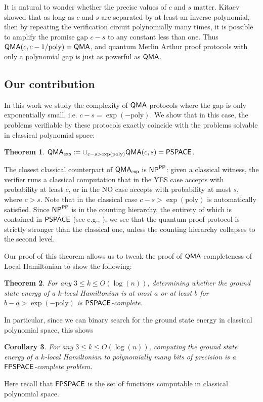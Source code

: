 \documentclass[11pt]{article}
\newtheorem{theorem}{Theorem}
\newtheorem{corollary}[theorem]{Corollary}
\theoremstyle{definition}
\theoremstyle{remark}
\newcommand\QMA{{\sf{QMA}}}
\newcommand\PSPACE{{\sf{PSPACE}}}
\newcommand\FPSPACE{{\sf{FPSPACE}}}
\newcommand\PP{\sf{PP}}
\newcommand\NP{{\sf{NP}}}
\newcommand\QMAexp{{\sf{QMA}_{exp}}}
\newcommand{\poly}{\textrm{poly}}
\begin{document}
It is natural to wonder whether the precise values of $c$ and $s$ matter. Kitaev showed \cite{ksv02} that as long as $c$ and $s$ are separated by at least an inverse polynomial, then by repeating the verification circuit polynomially many times, it is possible to amplify the promise gap $c-s$ to any constant less than one. Thus $\QMA(c,c-1/\poly) = \QMA$, and quantum Merlin Arthur proof protocols with only a polynomial gap is just as powerful as $\QMA$.

\subsection{Our contribution}

In this work we study the complexity of $\QMA$ protocols where the gap is only exponentially small, i.e. $c-s = \exp(-\poly)$. We show that in this case, the problems verifiable by these protocols exactly coincide with the problems solvable in classical polynomial space:

\begin{theorem}
$\QMAexp := \cup_{c-s > \exp(\poly)}\QMA(c,s) = \PSPACE$.
\end{theorem}

The closest classical counterpart of $\QMAexp$ is $\NP^{\PP}$: given a classical witness, the verifier runs a classical computation that in the YES case accepts with probability at least $c$, or in the NO case accepts with probability at most $s$, where $c>s$. Note that in the classical case $c - s > \exp(\poly)$ is automatically satisfied. Since $\NP^{\PP}$ is in the counting hierarchy, the entirety of which is contained in $\PSPACE$ (see e.g., \cite{allenderwagner}), we see that the quantum proof protocol is strictly stronger than the classical one, unless the counting hierarchy collapses to the second level.

Our proof of this theorem allows us to tweak the proof of $\QMA$-completeness of Local Hamiltonian \cite{ksv02,kr03} to show the following:

\begin{theorem}
For any $3 \le k \le O(\log(n))$, determining whether the ground state energy of a $k$-local Hamiltonian is at most $a$ or at least $b$ for $b-a > \exp(-\poly)$ is $\PSPACE$-complete.
\end{theorem}

In particular, since we can binary search for the ground state energy in classical polynomial space, this shows
\begin{corollary}
For any $3 \le k \le O(\log(n))$, computing the ground state energy of a $k$-local Hamiltonian to polynomially many bits of precision is a $\FPSPACE$-complete problem.
\end{corollary}
Here recall that $\FPSPACE$ is the set of functions computable in classical polynomial space.
\end{document}
